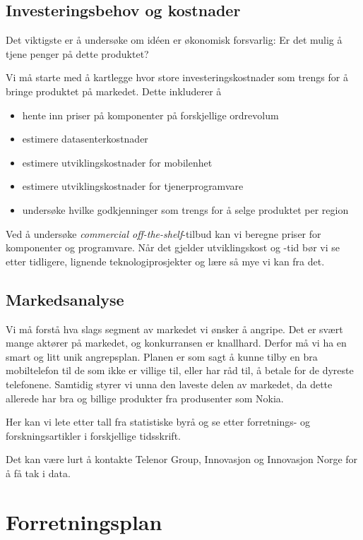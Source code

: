 \subsection{Investeringsbehov og kostnader}

Det viktigste er å undersøke om idéen er økonomisk forsvarlig: Er det mulig å
tjene penger på dette produktet?

Vi må starte med å kartlegge hvor store investeringskostnader som trengs for å
bringe produktet på markedet.  Dette inkluderer å

\begin{itemize}
  \item hente inn priser på komponenter på forskjellige ordrevolum
  \item estimere datasenterkostnader
  \item estimere utviklingskostnader for mobilenhet
  \item estimere utviklingskostnader for tjenerprogramvare
  \item undersøke hvilke godkjenninger som trengs for å selge produktet per
    region
\end{itemize}

Ved å undersøke \textit{commercial off-the-shelf}-tilbud kan vi beregne priser
for komponenter og programvare.  Når det gjelder utviklingskost og -tid bør vi
se etter tidligere, lignende teknologiprosjekter og lære så mye vi kan fra det.

\subsection{Markedsanalyse}

Vi må forstå hva slags segment av markedet vi ønsker å angripe. Det er svært
mange aktører på markedet, og konkurransen er knallhard. Derfor må vi ha en
smart og litt unik angrepsplan.  Planen er som sagt å kunne tilby en bra
mobiltelefon til de som ikke er villige til, eller har råd til, å betale for de
dyreste telefonene.  Samtidig styrer vi unna den laveste delen av markedet, da
dette allerede har bra og billige produkter fra produsenter som Nokia.

Her kan vi lete etter tall fra statistiske byrå og se etter forretnings- og
forskningsartikler i forskjellige tidsskrift.

Det kan være lurt å kontakte Telenor Group, Innovasjon og Innovasjon Norge for
å få tak i data.

\section{Forretningsplan}

